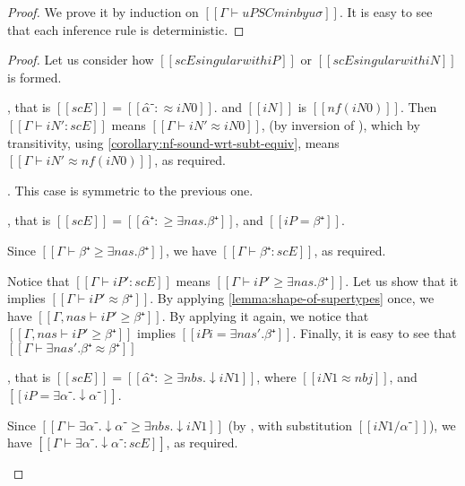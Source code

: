 \obsMinInstDeterministic*
\begin{proof}
    We prove it by induction on $[[Γ ⊢ uP SC minby uσ]]$.
    It is easy to see that each inference rule is deterministic.
\end{proof}

\lemEntrySingularitySoundness*
\begin{proof}
    Let us consider how $[[scE singular with iP]]$ or $[[scE singular with iN]]$ is formed.
    \begin{caseof}
        \item {}, that is $[[scE]] = [[α̂⁻ :≈ iN0]]$.
            and $[[iN]]$ is $[[nf(iN0)]]$.
            Then $[[Γ ⊢ iN' : scE]]$ means $[[Γ ⊢ iN' ≈ iN0]]$, 
            (by inversion of ),
            which by transitivity, using \cref{corollary:nf-sound-wrt-subt-equiv},
            means $[[Γ ⊢ iN' ≈ nf(iN0)]]$, 
            as required.
        \item {}. This case is symmetric to the previous one.

        \item {}, that is 
            $[[scE]] = [[α̂⁺ :≥ ∃nas.β⁺]]$, and $[[iP = β⁺]]$.

            Since $[[Γ ⊢ β⁺ ≥  ∃nas.β⁺]]$, we have $[[Γ ⊢ β⁺ : scE ]]$, 
            as required.

            Notice that $[[Γ ⊢ iP' : scE]]$ means $[[Γ ⊢ iP' ≥ ∃nas.β⁺]]$.
            Let us show that it implies $[[Γ ⊢ iP' ≈ β⁺]]$.
            By applying \cref{lemma:shape-of-supertypes} once, 
            we have $[[Γ, nas ⊢ iP' ≥ β⁺]]$.
            By applying it again, we notice that
            $[[Γ, nas ⊢ iP' ≥ β⁺]]$ implies $[[iPi = ∃nas'.β⁺]]$.
            Finally, it is easy to see that $[[Γ ⊢ ∃nas'.β⁺ ≈ β⁺]]$

        \item {},
            that is $[[scE]] = [[α̂⁺ :≥ ∃nbs.↓iN1]]$, 
            where $[[iN1 ≈ nbj]]$, and $[[iP = ∃α⁻.↓α⁻]]$.

            Since $[[Γ ⊢ ∃α⁻.↓α⁻ ≥ ∃nbs.↓iN1]]$ 
            (by , with substitution $[[iN1 / α⁻]]$),
            we have $[[Γ ⊢ ∃α⁻.↓α⁻ : scE ]]$, as required.


\end{caseof}
\end{proof}
